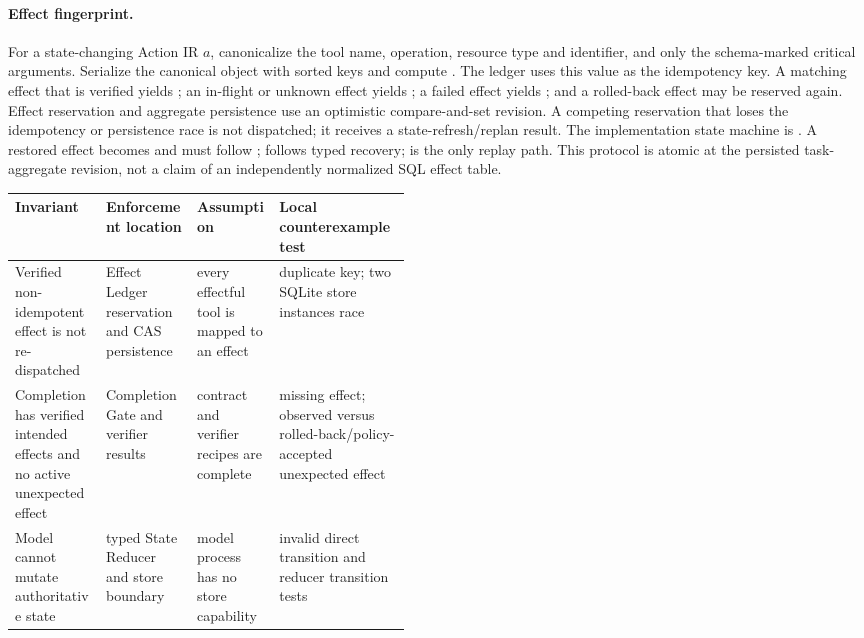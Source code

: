 \paragraph{Effect fingerprint.} For a state-changing Action IR $a$, canonicalize
the tool name, operation, resource type and identifier, and only the schema-marked
critical arguments. Serialize the canonical object with sorted keys and compute
. The ledger uses this value as the idempotency key. A matching effect
that is verified yields ; an in-flight or unknown effect
yields ; a failed effect yields ; and
a rolled-back effect may be reserved again. Effect reservation and aggregate
persistence use an optimistic compare-and-set revision. A competing reservation
that loses the idempotency or persistence race is not dispatched; it receives a
state-refresh/replan result. The implementation state machine is
. A restored  effect
becomes  and must follow ;  follows
typed recovery; 
is the only replay path. This protocol is atomic at the persisted task-aggregate
revision, not a claim of an independently normalized SQL effect table.

\begin{center}
\small
\begin{tabularx}{\linewidth}{@{}p{0.23\linewidth}p{0.23\linewidth}YY@{}}
\toprule
Invariant & Enforcement location & Assumption & Local counterexample test \\
\midrule
Verified non-idempotent effect is not re-dispatched & Effect Ledger reservation and CAS persistence & every effectful tool is mapped to an effect & duplicate key; two SQLite store instances race \\
Completion has verified intended effects and no active unexpected effect & Completion Gate and verifier results & contract and verifier recipes are complete & missing effect; observed versus rolled-back/policy-accepted unexpected effect \\
Model cannot mutate authoritative state & typed State Reducer and store boundary & model process has no store capability & invalid direct transition and reducer transition tests \\
\bottomrule
\end{tabularx}
\end{center}

